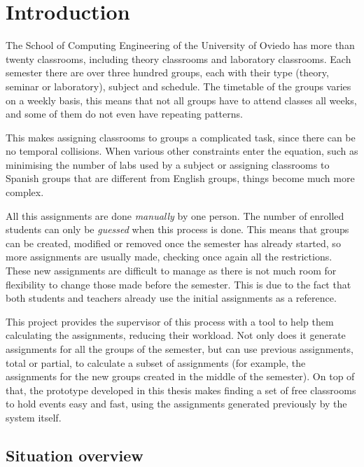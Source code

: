 \renewcommand{\documentname}{Introduction}

\chapter{Introduction}


The School of Computing Engineering of the University of Oviedo has more than twenty classrooms, including theory classrooms and laboratory classrooms. Each semester there are over three hundred groups, each with their type (theory, seminar or laboratory), subject and schedule. The timetable of the groups varies on a weekly basis, this means that not all groups have to attend classes all weeks, and some of them do not even have repeating patterns.

This makes assigning classrooms to groups a complicated task, since there can be no temporal collisions. When various other constraints enter the equation, such as minimising the number of labs used by a subject or assigning classrooms to Spanish groups that are different from English groups, things become much more complex.

All this assignments are done \textit{manually} by one person. The number of enrolled students can only be \textit{guessed} when this process is done. This means that groups can be created, modified or removed once the semester has already started, so more assignments are usually made, checking once again all the restrictions. These new assignments are difficult to manage as there is not much room for flexibility to change those made before the semester. This is due to the fact that both students and teachers already use the initial assignments as a reference.

This project provides the supervisor of this process with a tool to help them calculating the assignments, reducing their workload. Not only does it generate assignments for all the groups of the semester, but can use previous assignments, total or partial, to calculate a subset of assignments (for example, the assignments for the new groups created in the middle of the semester). On top of that, the prototype developed in this thesis makes finding a set of free classrooms to hold events easy and fast, using the assignments generated previously by the system itself.


\section{Situation overview}

